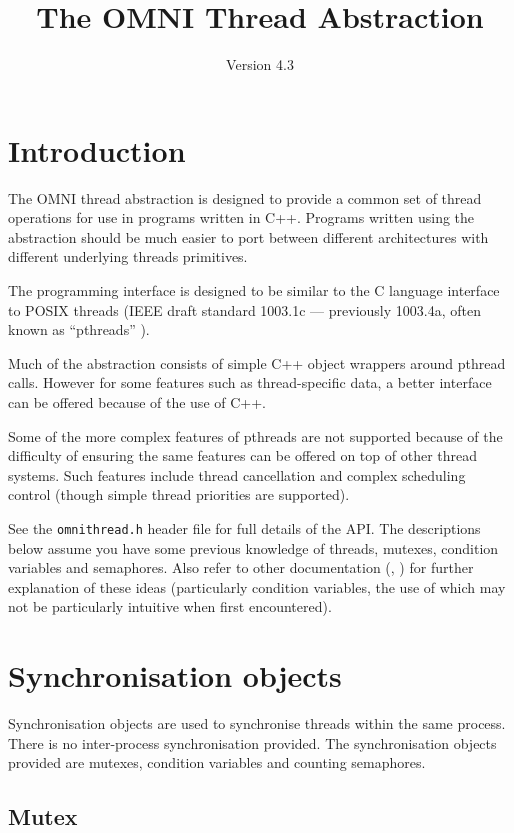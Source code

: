 \documentclass[11pt,oneside,a4paper]{article}
\title{The OMNI Thread Abstraction}
\date{Version 4.3}
\begin{document}
\maketitle

\section{Introduction}

The OMNI thread abstraction is designed to provide a common set of
thread operations for use in programs written in C++.  Programs
written using the abstraction should be much easier to port between
different architectures with different underlying threads primitives.

The programming interface is designed to be similar to the C language
interface to POSIX threads (IEEE draft standard 1003.1c --- previously
1003.4a, often known as ``pthreads'' \cite{pthreads}).

Much of the abstraction consists of simple C++ object wrappers around
pthread calls.  However for some features such as thread-specific
data, a better interface can be offered because of the use of C++.

Some of the more complex features of pthreads are not supported
because of the difficulty of ensuring the same features can be offered
on top of other thread systems.  Such features include thread
cancellation and complex scheduling control (though simple thread
priorities are supported).

See the \texttt{omnithread.h} header file for full details of the API.
The descriptions below assume you have some previous knowledge of
threads, mutexes, condition variables and semaphores.  Also refer to
other documentation (\cite{birrell}, \cite{pthreads}) for further
explanation of these ideas (particularly condition variables, the use
of which may not be particularly intuitive when first encountered).


\section{Synchronisation objects}

Synchronisation objects are used to synchronise threads within the
same process.  There is no inter-process synchronisation provided.
The synchronisation objects provided are mutexes, condition variables
and counting semaphores.

\subsection{Mutex}
\end{document}
